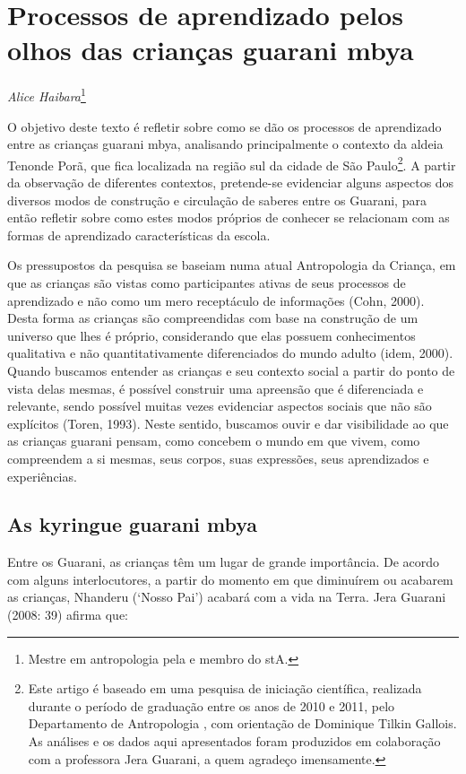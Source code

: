 \chapter{Processos de aprendizado pelos olhos das crianças guarani mbya}
\begin{flushright}
\emph{Alice Haibara}\footnote{Mestre em antropologia pela  e membro do
stA.}
\end{flushright}

O objetivo deste texto é refletir sobre como se dão os processos de
aprendizado entre as crianças guarani mbya, analisando principalmente o
contexto da aldeia Tenonde Porã, que fica localizada na região sul da
cidade de São Paulo\footnote{Este artigo é baseado em uma pesquisa de
iniciação científica, realizada durante o período de graduação entre os
anos de 2010 e 2011, pelo Departamento de Antropologia , com
orientação de Dominique Tilkin Gallois. As análises e os dados aqui
apresentados foram produzidos em colaboração com a professora Jera
Guarani, a quem agradeço imensamente.}. A partir da observação de
diferentes contextos, pretende-se evidenciar alguns aspectos dos
diversos modos de construção e circulação de saberes entre os Guarani,
para então refletir sobre como estes modos próprios de conhecer se
relacionam com as formas de aprendizado características da escola.

Os pressupostos da pesquisa se baseiam numa atual Antropologia da
Criança, em que as crianças são vistas como participantes ativas de
seus processos de aprendizado e não como um mero receptáculo de
informações (Cohn, 2000). Desta forma as crianças são compreendidas com
base na construção de um universo que lhes é próprio, considerando que
elas possuem conhecimentos qualitativa e não quantitativamente
diferenciados do mundo adulto (idem, 2000). Quando buscamos entender as
crianças e seu contexto social a partir do ponto de vista delas mesmas,
é possível construir uma apreensão que é diferenciada e relevante,
sendo possível muitas vezes evidenciar aspectos sociais que não são
explícitos (Toren, 1993). Neste sentido, buscamos ouvir e dar
visibilidade ao que as crianças guarani pensam, como concebem o mundo
em que vivem, como compreendem a si mesmas, seus corpos, suas
expressões, seus aprendizados e experiências. 

\section{As kyringue guarani mbya}
Entre os Guarani, as crianças têm um lugar de grande importância. De
acordo com alguns interlocutores, a partir do momento em que diminuírem
ou acabarem as crianças, Nhanderu (‘Nosso Pai’) acabará com a vida na
Terra. Jera Guarani (2008: 39) afirma que:

